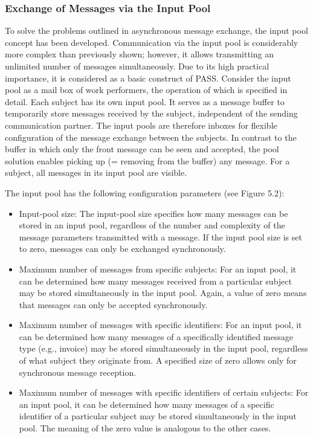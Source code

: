 \subsubsection{Exchange of Messages via the Input Pool}
\label{sec: inputpool}
To solve the problems outlined in asynchronous message exchange, the input pool concept has been developed. Communication via the input pool is considerably more complex than previously shown; however, it allows transmitting an unlimited number of messages simultaneously. Due to its high practical importance, it is considered as a basic construct of PASS.
Consider the input pool as a mail box of work performers, the operation of which is specified in detail.
Each subject has its own input pool. It serves as a message buffer to temporarily store messages received by the subject, independent of the sending communication partner. The input pools are therefore inboxes for flexible configuration of the message exchange between the subjects. In contrast to the buffer in which only the front message can be seen and accepted, the pool solution enables picking up (= removing from the buffer) any message. For a subject, all messages in its input pool are visible.

The input pool has the following configuration parameters (see \figurename{Figure 5.2}):
\begin{itemize}
	\item Input-pool size: The input-pool size specifies how many messages can be stored in an input pool, regardless of the number and complexity of the message parameters transmitted with a message. If the input pool size is set to zero, messages can only be exchanged synchronously.
	\item Maximum number of messages from specific subjects: For an input pool, it can be determined how many messages received from a particular subject may be stored simultaneously in the input pool. Again, a value of zero means that messages can only be accepted synchronously.
	\item Maximum number of messages with specific identifiers: For an input pool, it can be determined how many messages of a specifically identified message type (e.g., invoice) may be stored simultaneously in the input pool, regardless of what subject they originate from. A specified size of zero allows only for synchronous message reception.
	\item Maximum number of messages with specific identifiers of certain subjects: For an input pool, it can be determined how many messages of a specific identifier of a particular subject may be stored simultaneously in the input pool. The meaning of the zero value is analogous to the other cases.
\end{itemize}

